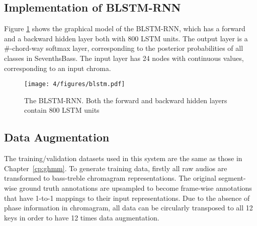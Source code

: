 \subsection{Implementation of BLSTM-RNN}
Figure \ref{fig:4-blstm} shows the graphical model of the BLSTM-RNN, which has a forward and a backward hidden layer both with 800 LSTM units. The output layer is a \#-chord-way softmax layer, corresponding to the posterior probabilities of all classes in SeventhsBass. The input layer has 24 nodes with continuous values, corresponding to an input chroma.

\begin{figure}[htb]
\centering
\texttt{[image: 4/figures/blstm.pdf]}
\caption{The BLSTM-RNN. Both the forward and backward hidden layers contain 800 LSTM units}
\label{fig:4-blstm}
\end{figure}

\subsection{Data Augmentation}
The training/validation datasets used in this system are the same as those in Chapter~\ref{cp:ghmm}. To generate training data, firstly all raw audios are transformed to bass-treble chromagram representations. The original segment-wise ground truth annotations are upsampled to become frame-wise annotations that have 1-to-1 mappings to their input representations. Due to the absence of phase information in chromagram, all data can be circularly transposed to all 12 keys in order to have 12 times data augmentation.

